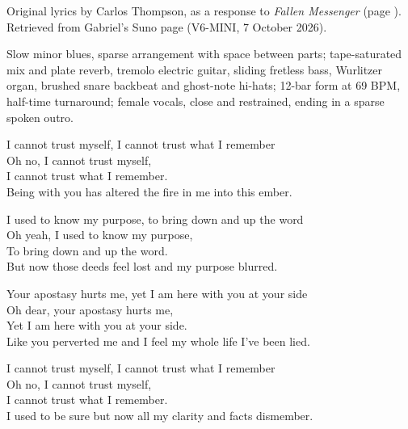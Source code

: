 
\label{sec:fallen}
\begin{notes}
Original lyrics by Carlos Thompson, as a response to \emph{Fallen Messenger} (page \pageref{sec:fallen-messenger}). Retrieved from Gabriel's Suno page (V6-MINI, 7 October 2026).
\end{notes}
\begin{style}
Slow minor blues, sparse arrangement with space between parts; tape-saturated mix and plate reverb, tremolo electric guitar, sliding fretless bass, Wurlitzer organ, brushed snare backbeat and ghost-note hi-hats; 12-bar form at 69 BPM, half-time turnaround; female vocals, close and restrained, ending in a sparse spoken outro.
\end{style}
\begin{lyrics}

I cannot trust myself, I cannot trust what I remember\\
Oh no, I cannot trust myself,\\
I cannot trust what I remember.\\
Being with you has altered the fire in me into this ember.


I used to know my purpose, to bring down and up the word\\
Oh yeah, I used to know my purpose,\\
To bring down and up the word.\\
But now those deeds feel lost and my purpose blurred.


Your apostasy hurts me, yet I am here with you at your side\\
Oh dear, your apostasy hurts me,\\
Yet I am here with you at your side.\\
Like you perverted me and I feel my whole life I've been lied.


I cannot trust myself, I cannot trust what I remember\\
Oh no, I cannot trust myself,\\
I cannot trust what I remember.\\
I used to be sure but now all my clarity and facts dismember.


\end{lyrics}
